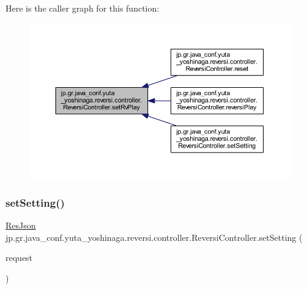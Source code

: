 Here is the caller graph for this function\+:
\nopagebreak
\begin{figure}[H]
\begin{center}
\leavevmode
\includegraphics[width=350pt]{classjp_1_1gr_1_1java__conf_1_1yuta__yoshinaga_1_1reversi_1_1controller_1_1_reversi_controller_a1d06864481177386fe8d2b01216790f4_icgraph}
\end{center}
\end{figure}
\mbox{\label{classjp_1_1gr_1_1java__conf_1_1yuta__yoshinaga_1_1reversi_1_1controller_1_1_reversi_controller_aad191800cbf367f237bf6160037255e8}} 
\subsubsection{\texorpdfstring{set\+Setting()}{setSetting()}}
{\footnotesize\ttfamily \hyperlink{classjp_1_1gr_1_1java__conf_1_1yuta__yoshinaga_1_1reversi_1_1model_1_1_res_json}{Res\+Json} jp.\+gr.\+java\+\_\+conf.\+yuta\+\_\+yoshinaga.\+reversi.\+controller.\+Reversi\+Controller.\+set\+Setting (\begin{DoxyParamCaption}\item[{Http\+Servlet\+Request}]{request }\end{DoxyParamCaption})}



